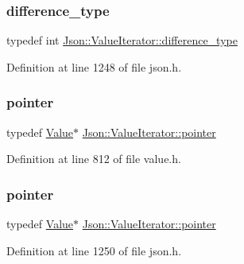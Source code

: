 \subsubsection{\texorpdfstring{difference\+\_\+type}{difference\_type}\hspace{0.1cm}{\footnotesize\ttfamily [2/2]}}
{\footnotesize\ttfamily typedef int \hyperlink{class_json_1_1_value_iterator_a2be1a9aa60bbfc8812e9dd1a7f1a8786}{Json\+::\+Value\+Iterator\+::difference\+\_\+type}}



Definition at line 1248 of file json.\+h.

\hypertarget{class_json_1_1_value_iterator_acec45feb1ef1f3bf81240157d06d5432}{}\label{class_json_1_1_value_iterator_acec45feb1ef1f3bf81240157d06d5432} 
\subsubsection{\texorpdfstring{pointer}{pointer}\hspace{0.1cm}{\footnotesize\ttfamily [1/2]}}
{\footnotesize\ttfamily typedef \hyperlink{class_json_1_1_value}{Value}$\ast$ \hyperlink{class_json_1_1_value_iterator_acec45feb1ef1f3bf81240157d06d5432}{Json\+::\+Value\+Iterator\+::pointer}}



Definition at line 812 of file value.\+h.

\hypertarget{class_json_1_1_value_iterator_acec45feb1ef1f3bf81240157d06d5432}{}\label{class_json_1_1_value_iterator_acec45feb1ef1f3bf81240157d06d5432} 
\subsubsection{\texorpdfstring{pointer}{pointer}\hspace{0.1cm}{\footnotesize\ttfamily [2/2]}}
{\footnotesize\ttfamily typedef \hyperlink{class_json_1_1_value}{Value}$\ast$ \hyperlink{class_json_1_1_value_iterator_acec45feb1ef1f3bf81240157d06d5432}{Json\+::\+Value\+Iterator\+::pointer}}



Definition at line 1250 of file json.\+h.

\hypertarget{class_json_1_1_value_iterator_ae87929b4567aa00372cf602c43b57160}{}\label{class_json_1_1_value_iterator_ae87929b4567aa00372cf602c43b57160} 
